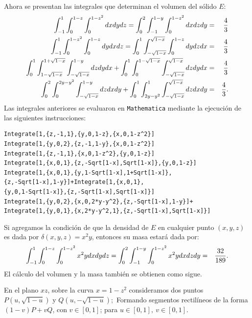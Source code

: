Ahora se presentan las integrales que determinan el volumen del sólido $E$:
\begin{eqnarray*}
\displaystyle \int_{-1}^{1}\int_{0}^{1-z}\int_{0}^{1-z^2}dxdydz=\displaystyle\int_{0}^2\int_{-1}^{1-y}\int_{0}^{1-z^2}dxdzdy&=& \frac{4}{3}\\
\displaystyle \int_{-1}^{1}\int_{0}^{1-z^2}\int_{0}^{1-z}dydxdz=\displaystyle\int_{0}^{1}\int_{-\sqrt{1-x}}^{\sqrt{1-x}}\int_{0}^{1-z}dydzdx&=& \frac{4}{3}\\
\displaystyle \int_{0}^{1}\int_{1-\sqrt{1-x}}^{1+\sqrt{1-x}}\int_{-\sqrt{1-x}}^{1-y}dzdydx+\int_{0}^{1}\int_{0}^{1-\sqrt{1-x}}\int_{-\sqrt{1-x}}^{\sqrt{1-x}}dzdydx&=& \frac{4}{3}\\
\displaystyle \int_{0}^2\int_{0}^{2y-y^2}\int_{-\sqrt{1-x}}^{1-y}dzdxdy+\int_{0}^{1} \int_{2y-y^2}^{1}\int_{-\sqrt{1-x}}^{\sqrt{1-x}}dzdxdy&=& \frac{4}{3}.
\end{eqnarray*}
Las integrales anteriores se evaluaron en \verb"Mathematica" mediante la ejecución de las siguientes instrucciones:

\begin{tcolorbox}[title=\bf Instrucción en \verb"Mathematica"]\begin{Verbatim}[formatcom=\letraverbatim]
Integrate[1,{z,-1,1},{y,0,1-z},{x,0,1-z^2}]
Integrate[1,{y,0,2},{z,-1,1-y},{x,0,1-z^2}]
Integrate[1,{z,-1,1},{x,0,1-z^2},{y,0,1-z}]
Integrate[1,{x,0,1},{z,-Sqrt[1-x],Sqrt[1-x]},{y,0,1-z}]
Integrate[1,{x,0,1},{y,1-Sqrt[1-x],1+Sqrt[1-x]},
{z,-Sqrt[1-x],1-y}]+Integrate[1,{x,0,1},
{y,0,1-Sqrt[1-x]},{z,-Sqrt[1-x],Sqrt[1-x]}]
Integrate[1,{y,0,2},{x,0,2*y-y^2},{z,-Sqrt[1-x],1-y}]+
Integrate[1,{y,0,1},{x,2*y-y^2,1},{z,-Sqrt[1-x],Sqrt[1-x]}]
\end{Verbatim}
\end{tcolorbox}

Si agregamos la condición de que la densidad de $E$ en cualquier punto $(x,y,z)$ es
dada por $\delta(x,y,z)=x^2y$, entonces su masa estará dada por:
\begin{eqnarray*}
\displaystyle \int_{-1}^{1}\int_{0}^{1-z}\int_{0}^{1-z^2}x^2ydxdydz=\displaystyle\int_{0}^2\int_{-1}^{1-y}\int_{0}^{1-z^2}x^2ydxdzdy&=&\frac{32}{189}.
\end{eqnarray*}
El cálculo del volumen y la masa también se obtienen como sigue.

En el plano $xz$, sobre la curva $x=1-z^2$ consideramos dos puntos $P(u,\sqrt{1-u})$ y $Q(u,-\sqrt{1-u});$ Formando segmentos rectilíneos de la forma $(1-v)P +vQ$, con $v\in [0,1]$;  para $u \in [0,1],\ v \in [0,1]$.

